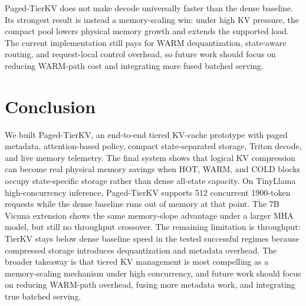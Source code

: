 \documentclass{article}
\begin{document}
Paged-TierKV does not make decode universally faster than the dense baseline. Its strongest result is instead a memory-scaling win: under high KV pressure, the compact pool lowers physical memory growth and extends the supported load. The current implementation still pays for WARM dequantization, state-aware routing, and request-local control overhead, so future work should focus on reducing WARM-path cost and integrating more fused batched serving.

\section{Conclusion}

We built Paged-TierKV, an end-to-end tiered KV-cache prototype with paged metadata, attention-based policy, compact state-separated storage, Triton decode, and live memory telemetry. The final system shows that logical KV compression can become real physical memory savings when HOT, WARM, and COLD blocks occupy state-specific storage rather than dense all-state capacity. On TinyLlama high-concurrency inference, Paged-TierKV supports 512 concurrent 1900-token requests while the dense baseline runs out of memory at that point. The 7B Vicuna extension shows the same memory-slope advantage under a larger MHA model, but still no throughput crossover. The remaining limitation is throughput: TierKV stays below dense baseline speed in the tested successful regimes because compressed storage introduces dequantization and metadata overhead. The broader takeaway is that tiered KV management is most compelling as a memory-scaling mechanism under high concurrency, and future work should focus on reducing WARM-path overhead, fusing more metadata work, and integrating true batched serving.



 

\end{document}
